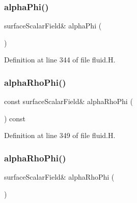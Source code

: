 \subsubsection{\texorpdfstring{alpha\+Phi()}{alphaPhi()}\hspace{0.1cm}{\footnotesize\ttfamily [2/2]}}
{\footnotesize\ttfamily surface\+Scalar\+Field\& alpha\+Phi (\begin{DoxyParamCaption}{ }\end{DoxyParamCaption})\hspace{0.3cm}{\ttfamily [inline]}}



Definition at line 344 of file fluid.\+H.

\mbox{\label{classFoam_1_1fluid_aed70c38fb7edef9dea0159ce01de86f6}} 
\subsubsection{\texorpdfstring{alpha\+Rho\+Phi()}{alphaRhoPhi()}\hspace{0.1cm}{\footnotesize\ttfamily [1/2]}}
{\footnotesize\ttfamily const surface\+Scalar\+Field\& alpha\+Rho\+Phi (\begin{DoxyParamCaption}{ }\end{DoxyParamCaption}) const\hspace{0.3cm}{\ttfamily [inline]}}



Definition at line 349 of file fluid.\+H.

\mbox{\label{classFoam_1_1fluid_ac84568157c5a273492634b3211bf990d}} 
\subsubsection{\texorpdfstring{alpha\+Rho\+Phi()}{alphaRhoPhi()}\hspace{0.1cm}{\footnotesize\ttfamily [2/2]}}
{\footnotesize\ttfamily surface\+Scalar\+Field\& alpha\+Rho\+Phi (\begin{DoxyParamCaption}{ }\end{DoxyParamCaption})\hspace{0.3cm}{\ttfamily [inline]}}




